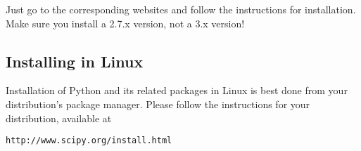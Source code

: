 Just go to the corresponding websites and follow the instructions for installation. Make sure you install a 2.7.x version, not a 3.x version!

%
%
%
%
%
%
%
%
%
%
% 
%
%
%


%
%
%
%

\subsection{Installing in Linux}

Installation of Python and its related packages in Linux is best done from your distribution's package manager. Please follow the instructions for your distribution, available at
\begin{verbatim}
http://www.scipy.org/install.html
\end{verbatim}

